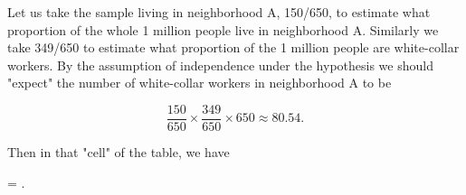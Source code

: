 Let us take the sample living in neighborhood A, 150/650, to estimate what proportion of the whole 1 million people live in neighborhood A. Similarly we take 349/650 to estimate what proportion of the 1 million people are white-collar workers. By the assumption of independence under the hypothesis we should "expect" the number of white-collar workers in neighborhood A to be

\[ \frac{150}{650}\times\frac{349}{650}\times650 \approx 80.54. \]

Then in that "cell" of the table, we have

 = .


